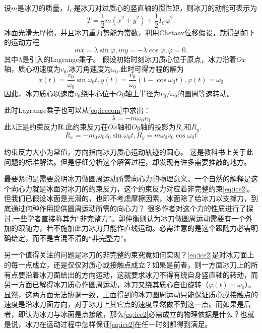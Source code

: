 \documentclass[A4,twoside]{ctexart}
\begin{document}
设$m$是冰刀的质量，$I_C$是冰刀对过质心的竖直轴的惯性矩，则冰刀的动能可表示为
\begin{equation}
  \label{eq:ice3}
  T = \frac{1}{2}m\left(\dot{x}^2+\dot{y}^2\right)+\frac{1}{2}I_C\dot{\varphi}^2.
\end{equation}
冰面光滑无摩擦，并且冰刀重力势能为常数，利用Chetaev位移假设，就得到如下的运动方程
\begin{equation}
  \label{eq:iceeom}
  m \ddot{x} = \lambda \sin\varphi, m \ddot{y} = -\lambda \cos\varphi, \ddot{\varphi} = 0.
\end{equation}
其中$\lambda$是引入的Lagrange乘子。
假设初始时刻冰刀质心位于原点，冰刀沿着$Ox$轴，质心初速度为$v_0$,冰刀角速度为$\omega_0$.此时可得方程的解为
\begin{equation}
  \label{eq:icesol}
  x(t) = \frac{v_0}{\omega_0}\sin\omega_0t, y(t) = \frac{v_0}{\omega_0}(1 - \cos\omega_0t), \varphi(t) = \omega_0
\end{equation}
因此，冰刀质心以速度$v_0$绕中心位于$Oy$轴上半径为$v_0/\omega_0$的圆周等速转动。

此时Lagrange乘子也可以从\eqref{eq:iceeom}中求出：
\begin{equation}
  \label{eq:icel}
 \lambda = -m\omega_0v_0
\end{equation}
此$\lambda$正是约束反力$\mathbf{R}$.此约束反力在$Ox$轴和$Oy$轴的投影为$R_x$和$R_y$.
\begin{equation}
  \label{eq:icecon}
  R_x = -m_0\omega_0v_0\sin\omega_0t, R_y = m \omega_0v_0\cos\omega_0t
\end{equation}

约束反力大小为常值，方向指向冰刀质心运动轨迹的圆心。
这是教科书上关于此问题的标准解法\supercite{9,10}。但是仔细分析这个解答过程，却发现有许多需要推敲的地方。

最要紧的是需要说明冰刀做圆周运动所需向心力的物理意义。一个自然的解释是这个向心力就是冰面对冰刀的约束反力，这个约束反力对应着非完整约束\eqref{eq:ice2}。但我们已假设冰面是光滑的，也即不考虑摩擦因素，冰面除了给冰刀以支撑力，到底通过何种作用提供圆周运动所需的向心力？
很多作者对这个力的性质进行了探讨,一些学者直接称其为“非完整力”。郭仲衡\supercite{6}则认为冰刀做圆周运动需要有一个外加的跟随力，若不施加此力冰刀只能作直线运动。必需注意的是这个跟随力必需明确给定，而不是含混不清的“非完整力”。

另一个值得关注的问题是冰刀的非完整约束究竟如何实现？\eqref{eq:ice2}是对冰刀面上的每一点成立，还是仅仅对质心或接触点成立？如果是前者，则一方面冰刀上的所有点要沿着冰刀面给出的方向运动，这就要求冰刀不得有绕自身竖直轴的转动，而另一方面已解得冰刀质心作圆周运动，冰刀又绕其质心自由旋转（$\varphi(t)=\omega_0$）。显然，这两方面无法协调一致，上面得到的冰刀圆周运动只能保证质心或接触点的速度是沿冰刀面方向，对于冰刀上其它点的速度显然做不到这一点。而如果是后者，即认为冰刀与冰面是点接触，那么\eqref{eq:ice2}必需成立的物理依据是什么？也就是说，冰刀在运动过程中怎样保证\eqref{eq:ice2}在任一时刻都得到满足。
\end{document}
